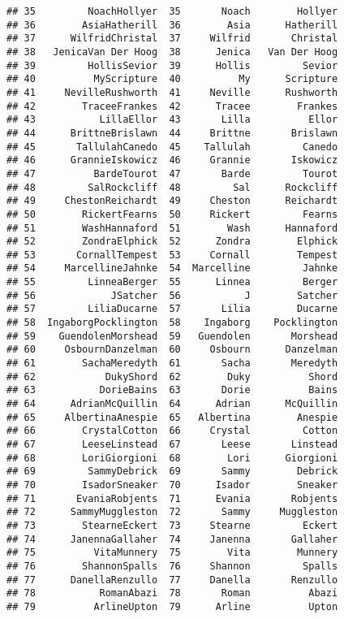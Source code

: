 \documentclass[]{article}
\begin{document}
\begin{verbatim}
## 35         NoachHollyer  35       Noach        Hollyer
## 36        AsiaHatherill  36        Asia      Hatherill
## 37      WilfridChristal  37     Wilfrid       Christal
## 38   JenicaVan Der Hoog  38      Jenica   Van Der Hoog
## 39         HollisSevior  39      Hollis         Sevior
## 40          MyScripture  40          My      Scripture
## 41     NevilleRushworth  41     Neville      Rushworth
## 42        TraceeFrankes  42      Tracee        Frankes
## 43           LillaEllor  43       Lilla          Ellor
## 44      BrittneBrislawn  44     Brittne       Brislawn
## 45       TallulahCanedo  45    Tallulah         Canedo
## 46      GrannieIskowicz  46     Grannie       Iskowicz
## 47          BardeTourot  47       Barde         Tourot
## 48         SalRockcliff  48         Sal      Rockcliff
## 49     ChestonReichardt  49     Cheston      Reichardt
## 50        RickertFearns  50     Rickert         Fearns
## 51        WashHannaford  51        Wash      Hannaford
## 52        ZondraElphick  52      Zondra        Elphick
## 53       CornallTempest  53     Cornall        Tempest
## 54     MarcellineJahnke  54  Marcelline         Jahnke
## 55         LinneaBerger  55      Linnea         Berger
## 56             JSatcher  56           J        Satcher
## 57         LiliaDucarne  57       Lilia        Ducarne
## 58  IngaborgPocklington  58    Ingaborg    Pocklington
## 59    GuendolenMorshead  59   Guendolen       Morshead
## 60     OsbournDanzelman  60     Osbourn      Danzelman
## 61        SachaMeredyth  61       Sacha       Meredyth
## 62            DukyShord  62        Duky          Shord
## 63           DorieBains  63       Dorie          Bains
## 64      AdrianMcQuillin  64      Adrian      McQuillin
## 65     AlbertinaAnespie  65   Albertina        Anespie
## 66        CrystalCotton  66     Crystal         Cotton
## 67        LeeseLinstead  67       Leese       Linstead
## 68        LoriGiorgioni  68        Lori      Giorgioni
## 69         SammyDebrick  69       Sammy        Debrick
## 70        IsadorSneaker  70      Isador        Sneaker
## 71       EvaniaRobjents  71      Evania       Robjents
## 72      SammyMuggleston  72       Sammy     Muggleston
## 73        StearneEckert  73     Stearne         Eckert
## 74      JanennaGallaher  74     Janenna       Gallaher
## 75          VitaMunnery  75        Vita        Munnery
## 76        ShannonSpalls  76     Shannon         Spalls
## 77      DanellaRenzullo  77     Danella       Renzullo
## 78           RomanAbazi  78       Roman          Abazi
## 79          ArlineUpton  79      Arline          Upton

\end{verbatim}
\end{document}
